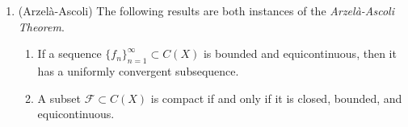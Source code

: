 \documentclass{article}
\begin{document}
\begin{enumerate}[resume=real_analysis]
\begin{enumerate}[itemsep =-2pt,label = (\alph{*})]
\begin{equation*}
		\end{equation*}
		\item (Fubini) If $f \in L^{1}(\mu \times \nu)$, then $f_{x} \in L^{1}(\nu)$ for a.e. $x$ and $f^{y} \in L^{1}(\mu)$ for a.e. $y$, and the above equation holds. 
	\end{enumerate}
	\item (Arzel\`a-Ascoli) The following results are both instances of the \textit{Arzel\`a-Ascoli Theorem}. \vspace{-0.25cm}
	\begin{enumerate}[itemsep =-2pt,label = (\alph{*})]
		\item If a sequence $\{f_{n}\}_{n = 1}^{\infty} \subset C(X)$ is bounded and equicontinuous, then it has a uniformly convergent subsequence. 
		\item A subset $\mathscr{F} \subset C(X)$ is compact if and only if it is closed, bounded, and equicontinuous. 
	\end{enumerate}
\end{enumerate}
\end{document}
